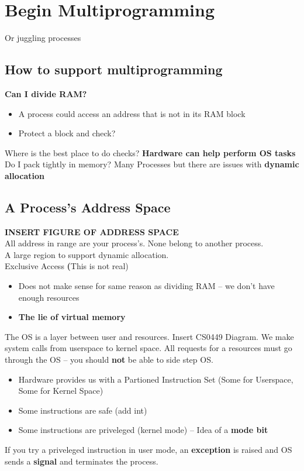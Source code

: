 \documentclass[../base_file/cs1550_notes.tex]{subfiles}
\begin{document}
\chapter{Begin Multiprogramming}
Or juggling processes
\section{How to support multiprogramming}
\textbf{Can I divide RAM?}
	\begin{itemize}
	\item A process could access an address that is not in its RAM block
	\item Protect a block and check?
	\end{itemize}
Where is the best place to do checks?  \textbf{Hardware can help perform OS tasks}
Do I pack tightly in memory?  Many Processes but there are issues with \textbf{dynamic allocation}

\section{A Process's Address Space}
\textbf{INSERT FIGURE OF ADDRESS SPACE}\\
All address in range are your process's. None belong to another process.\\
A large region to support dynamic allocation.\\
Exclusive Access \textbf(This is not real)
	\begin{itemize}
	\item Does not make sense for same reason as dividing RAM -- we don't have enough resources
   	\item \textbf{The lie of virtual memory}
	\end{itemize}	
The OS is a layer between user and resources.  Insert CS0449 Diagram.  We make system calls from userspace
to kernel space.  All requests for a resources must go through the OS -- you should \textbf{not} be able
to side step OS.
	\begin{itemize}
	\item Hardware provides us with a Partioned Instruction Set (Some for Userspace, Some for Kernel Space)
	\item Some instructions are safe (add int)
	\item Some instructions are priveleged (kernel mode) -- Idea of a \textbf{mode bit}
	\end{itemize}
If you try a priveleged instruction in user mode, an \textbf{exception} is raised and OS sends a
\textbf{signal} and terminates the process.\\
\end{document}

